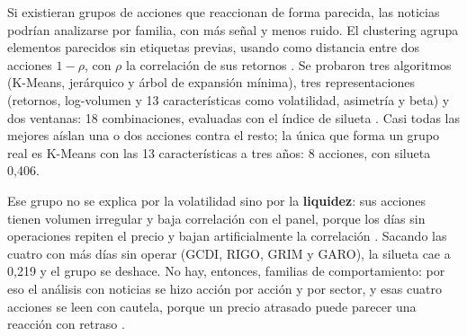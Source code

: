Si existieran grupos de acciones que reaccionan de forma parecida, las noticias podrían
analizarse por familia, con más señal y menos ruido. El clustering agrupa elementos parecidos sin
etiquetas previas, usando como distancia entre dos acciones $1-\rho$, con $\rho$ la correlación de
sus retornos \citep{mantegna1999}. Se probaron tres algoritmos (K-Means, jerárquico y árbol de
expansión mínima), tres representaciones (retornos, log-volumen y 13 características como
volatilidad, asimetría y beta) y dos ventanas: 18 combinaciones, evaluadas con el índice de
silueta \citep{rousseeuw1987}. Casi todas las mejores aíslan una o dos acciones contra el resto;
la única que forma un grupo real es K-Means con las 13 características a tres años: 8 acciones,
con silueta 0,406.

Ese grupo no se explica por la volatilidad sino por la \textbf{liquidez}: sus acciones tienen
volumen irregular y baja correlación con el panel, porque los días sin operaciones repiten el
precio y bajan artificialmente la correlación \citep{nanyonga2025,lesmond1999}. Sacando las
cuatro con más días sin operar (GCDI, RIGO, GRIM y GARO), la silueta cae a 0,219 y el grupo se
deshace. No hay, entonces, familias de comportamiento: por eso el análisis con noticias se hizo
acción por acción y por sector, y esas cuatro acciones se leen con cautela, porque un precio
atrasado puede parecer una reacción con retraso \citep{lomackinlay1990}.
